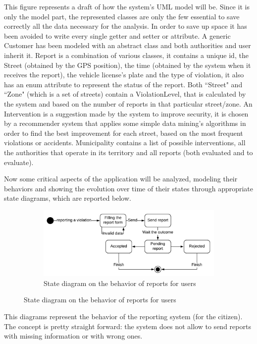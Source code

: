 \documentclass[12pt,a4paper]{report}
\begin{document}
		This figure represents a draft of how the system's UML model will be. Since it is only the model part, the represented classes are only the few essential to save correctly all the data necessary for the analysis. In order to save up space it has been avoided to write every single getter and setter or attribute.
		A generic Customer has been modeled with an abstract class and both authorities and user inherit it.
		Report is a combination of various classes, it contains a unique id, the Street (obtained by the GPS position), the time (obtained
		by the system when it receives the report), the vehicle license's plate and the type of violation, it also has an enum attribute
		to represent the status of the report. Both ``Street" and ``Zone" (which is a set of streets) contain a ViolationLevel, that
		is calculated by the system and based on the number of reports in that particular street/zone. An Intervention is a suggestion made
		by the system to improve security, it is chosen by a recommender system that applies some simple data mining's algorithms
		in order to find the best improvement for each street, based on the most frequent violations or accidents.
		Municipality contains a list of possible interventions, all the authorities that operate in its territory and all reports
		(both evaluated and to evaluate).

		Now some critical aspects of the application will be analyzed, modeling their behaviors and	
		showing the evolution over time of their	states through appropriate state diagrams, which are
		reported below.
		
		\begin{figure}[H]
			\begin{subfigure}{\textwidth}
				\includegraphics[scale = 0.75, center]{reportC}
				\caption{State diagram on the behavior of reports for users}
			\end{subfigure}
		\end{figure}
		This diagrams represent the behavior of the reporting system (for the citizen). The concept is pretty straight forward: the system does not allow to send reports
		with missing information or with wrong ones.
		
\end{document}
